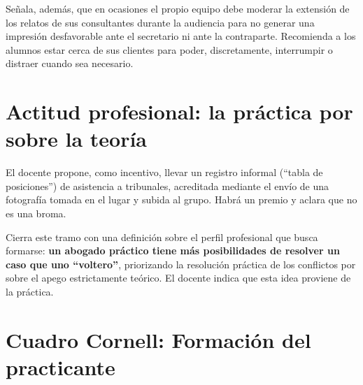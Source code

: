 \documentclass[12pt,oneside]{book}
\begin{document}
Se\~nala, adem\'as, que en ocasiones el propio equipo debe moderar la extensi\'on de los relatos de sus consultantes durante la audiencia para no generar una impresi\'on desfavorable ante el secretario ni ante la contraparte. Recomienda a los alumnos estar cerca de sus clientes para poder, discretamente, interrumpir o distraer cuando sea necesario.

\section{Actitud profesional: la pr\'actica por sobre la teor\'ia}

El docente propone, como incentivo, llevar un registro informal (``tabla de posiciones'') de asistencia a tribunales, acreditada mediante el env\'io de una fotograf\'ia tomada en el lugar y subida al grupo. Habr\'a un premio y aclara que no es una broma.

Cierra este tramo con una definici\'on sobre el perfil profesional que busca formarse: \textbf{un abogado pr\'actico tiene m\'as posibilidades de resolver un caso que uno ``voltero''}, priorizando la resoluci\'on pr\'actica de los conflictos por sobre el apego estrictamente te\'orico. El docente indica que esta idea proviene de la pr\'actica.

\section*{Cuadro Cornell: Formaci\'on del practicante}
\end{document}
